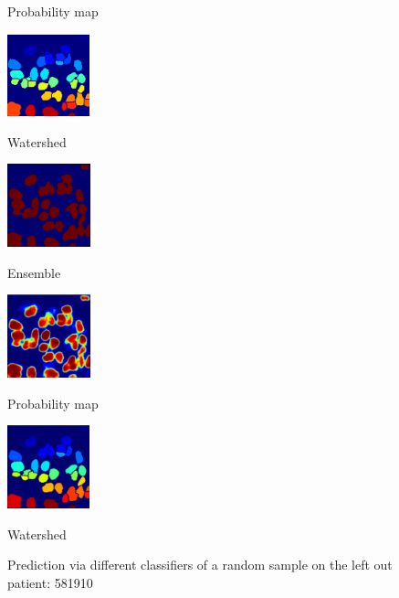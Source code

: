 \documentclass{article}
\begin{document}
\begin{figure}[htb]
\begin{minipage}[b]{.32\linewidth}
  \centerline{Probability map}\medskip
\end{minipage}
\hfill
\begin{minipage}[b]{.32\linewidth}
  \centering
  \centerline{\includegraphics[height=2.4cm]{FCN_WS}}
  \centerline{Watershed}\medskip
\end{minipage}
%
\begin{minipage}[b]{0.32\linewidth}
  \centering
  \centerline{\includegraphics[height=2.4cm]{EnsembleB}}
  \centerline{Ensemble}\medskip
\end{minipage}
\hfill
\begin{minipage}[b]{.32\linewidth}
  \centering
  \centerline{\includegraphics[height=2.4cm]{EnsembleP}}
  \centerline{Probability map}\medskip
\end{minipage}
\hfill
\begin{minipage}[b]{.32\linewidth}
  \centering
  \centerline{\includegraphics[height=2.4cm]{Ensemble_WS}}
  \centerline{Watershed}\medskip
\end{minipage}
\caption{Prediction via different classifiers of a random sample on the left out patient: 581910}
\label{fig:prediction}
%
\end{figure}
\end{document}
